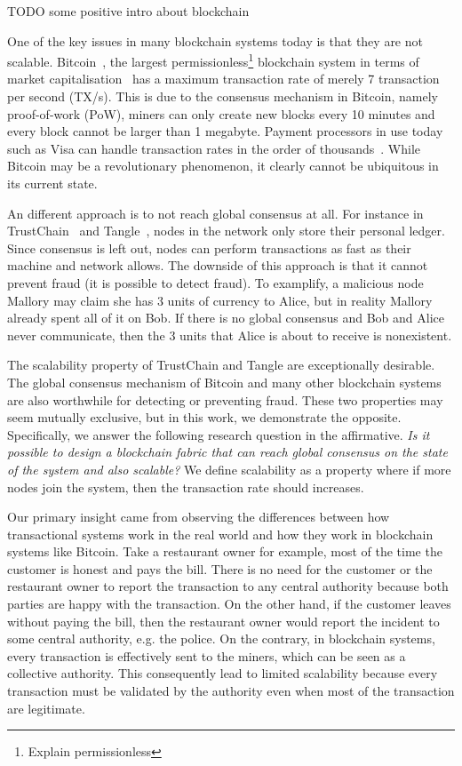 TODO some positive intro about blockchain

One of the key issues in many blockchain systems today is that they are not scalable.
Bitcoin~\cite{bitcoin}, the largest permissionless\footnote{Explain permissionless} blockchain system
in terms of market capitalisation~\cite{bitcoinmarketcap} has a maximum transaction rate of merely 7 transaction per second (TX/s).
This is due to the consensus mechanism in Bitcoin, namely proof-of-work (PoW),
miners can only create new blocks every 10 minutes and every block cannot be larger than 1 megabyte.
Payment processors in use today such as Visa can handle transaction rates in the order of thousands~\cite{visa}.
While Bitcoin may be a revolutionary phenomenon, it clearly cannot be ubiquitous in its current state.

An different approach is to not reach global consensus at all.
For instance in TrustChain~\cite{multichain} and Tangle~\cite{tangle},
nodes in the network only store their personal ledger.
Since consensus is left out, nodes can perform transactions as fast as their machine and network allows.
The downside of this approach is that it cannot prevent fraud (it is possible to detect fraud).
To examplify, a malicious node Mallory may claim she has 3 units of currency to Alice,
but in reality Mallory already spent all of it on Bob.
If there is no global consensus and Bob and Alice never communicate,
then the 3 units that Alice is about to receive is nonexistent.

The scalability property of TrustChain and Tangle are exceptionally desirable.
The global consensus mechanism of Bitcoin and many other blockchain systems are also worthwhile for detecting or preventing fraud.
These two properties may seem mutually exclusive, but in this work, we demonstrate the opposite.
Specifically, we answer the following research question in the affirmative.
\emph{Is it possible to design a blockchain fabric that can reach global consensus on the state of the system 
and also scalable?} We define scalability as a property where if more nodes join the system, then the transaction rate should increases.

Our primary insight came from observing the differences between how transactional systems work in the real world and how they work in blockchain systems like Bitcoin. 
Take a restaurant owner for example, most of the time the customer is honest and pays the bill.
There is no need for the customer or the restaurant owner to report the transaction to any central authority 
because both parties are happy with the transaction.
On the other hand, if the customer leaves without paying the bill,
then the restaurant owner would report the incident to some central authority, e.g. the police.
On the contrary, in blockchain systems, every transaction is effectively sent to the miners,
which can be seen as a collective authority.
This consequently lead to limited scalability because every transaction must be validated by the authority even when most of the transaction are legitimate.

